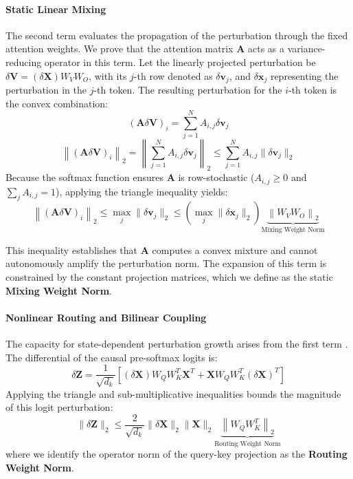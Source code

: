 \documentclass[a4paper,12pt]{article}
\begin{document}
    \paragraph{Static Linear Mixing}
    The second term evaluates the propagation of the perturbation through the fixed attention weights. We prove that the attention matrix $\mathbf{A}$ acts as a variance-reducing operator in this term. Let the linearly projected perturbation be $\delta \mathbf{V} = (\delta \mathbf{X}) W_V W_O$, with its $j$-th row denoted as $\delta \mathbf{v}_j$, and $\delta \mathbf{x}_j$ representing the perturbation in the $j$-th token. The resulting perturbation for the $i$-th token is the convex combination:
    \begin{equation}
        (\mathbf{A} \delta \mathbf{V})_i = \sum_{j=1}^N A_{i,j} \delta \mathbf{v}_j
    \end{equation}
    \begin{equation}
       \left\| (\mathbf{A} \delta \mathbf{V})_i \right\|_2 = \left\| \sum_{j=1}^N A_{i,j} \delta \mathbf{v}_j \right\|_2 \le \sum_{j=1}^N A_{i,j} \|\delta \mathbf{v}_j\|_2
    \end{equation}
    Because the softmax function ensures $\mathbf{A}$ is row-stochastic ($A_{i,j} \ge 0$ and $\sum_j A_{i,j} = 1$), applying the triangle inequality yields:
    \begin{equation}
        \left\| (\mathbf{A} \delta \mathbf{V})_i \right\|_2 \le \max_j \|\delta \mathbf{v}_j\|_2 \le \left(\max_j \|\delta \mathbf{x}_j\|_2\right) \underbrace{\left\| W_V W_O \right\|_2}_{\text{Mixing Weight Norm}}
    \end{equation}

    This inequality establishes that $\mathbf{A}$ computes a convex mixture and cannot autonomously amplify the perturbation norm. The expansion of this term is constrained by the constant projection matrices, which we define as the static \textbf{Mixing Weight Norm}.

    \paragraph{Nonlinear Routing and Bilinear Coupling}
    The capacity for state-dependent perturbation growth arises from the first term \cite{kim2021lipschitzconstantselfattention}. The differential of the causal pre-softmax logits is:
    \begin{equation}
        \delta \mathbf{Z} = \frac{1}{\sqrt{d_k}} \left[ (\delta \mathbf{X}) W_Q W_K^T \mathbf{X}^T + \mathbf{X} W_Q W_K^T (\delta \mathbf{X})^T \right]
    \end{equation}
    Applying the triangle and sub-multiplicative inequalities bounds the magnitude of this logit perturbation:
    \begin{equation}
        \|\delta \mathbf{Z}\|_2 \le \frac{2}{\sqrt{d_k}} \|\delta \mathbf{X}\|_2 \|\mathbf{X}\|_2 \underbrace{\left\| W_Q W_K^T \right\|_2}_{\text{Routing Weight Norm}}
    \end{equation}
    where we identify the operator norm of the query-key projection as the \textbf{Routing Weight Norm}. 
\end{document}
